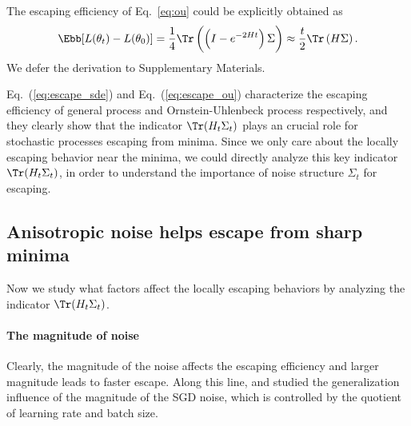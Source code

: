 \documentclass{article}
\begin{document}
The escaping efficiency of Eq.~\eqref{eq:ou} could be explicitly obtained as
\begin{equation}
    \Ebb [L(\theta_t)-L(\theta_0)] = \frac{1}{4} \Tr\left(\left( I-e^{-2Ht}\right)\Sigma\right)\approx \frac{t}{2} \Tr\left(H\Sigma\right).
    \label{eq:escape_ou}
\end{equation}
We defer the derivation to Supplementary Materials.

Eq.~(\ref{eq:escape_sde}) and Eq.~(\ref{eq:escape_ou}) characterize the escaping efficiency of general process and  Ornstein-Uhlenbeck process respectively, and they clearly show that the indicator $\Tr(H_t\Sigma_t)$ plays an crucial role for stochastic processes escaping from minima.
Since we only care about the locally escaping behavior near the minima, we could directly analyze this key indicator $\Tr (H_t\Sigma_t)$, in order to understand the importance of noise structure $\Sigma_t$ for escaping.

\subsection{Anisotropic noise helps escape from sharp minima}
Now we study what factors affect the locally escaping behaviors by analyzing the indicator $\Tr (H_t\Sigma_t)$.

\paragraph{The magnitude of noise}
Clearly, the magnitude of the noise affects the escaping efficiency and larger magnitude leads to faster escape.
Along this line, \citet{hoffer2017} and \citet{jastrzkebski2017three} studied the generalization influence of the magnitude of the SGD noise, which is controlled by the quotient of learning rate and batch size.
\end{document}
